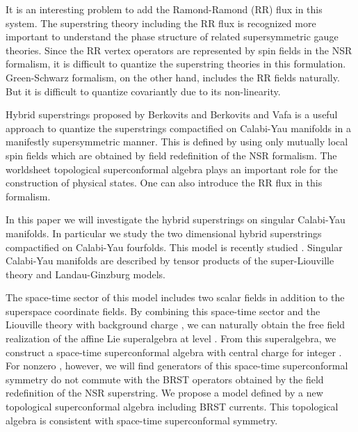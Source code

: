 \documentclass[a4paper,12pt]{article}
\begin{document}
It is an interesting problem to add the 
Ramond-Ramond (RR) flux in this system.
The superstring theory including the RR flux is recognized more
important to understand the phase structure of related supersymmetric
gauge theories\cite{Va}. 
Since the RR vertex operators are represented by spin fields in the 
NSR formalism, it is difficult  to quantize the superstring theories
in this formulation.
Green-Schwarz formalism, on the other hand, includes the RR fields
naturally. But it is difficult to quantize covariantly due to its 
non-linearity.

Hybrid superstrings proposed by Berkovits \cite{Be} and Berkovits and
Vafa \cite{BeVa}
is a useful approach to quantize the superstrings compactified on 
Calabi-Yau manifolds in a manifestly supersymmetric manner.
This is defined by using only mutually local spin fields which are 
obtained by field redefinition of the NSR formalism.
The worldsheet topological \coordHE{} superconformal algebra plays an
important role for the construction of physical states.
One can also introduce the RR flux in this formalism\cite{BeVaWi}.

In this paper we will investigate the hybrid superstrings on singular
Calabi-Yau
manifolds. In particular we study the two dimensional hybrid
superstrings
compactified on Calabi-Yau fourfolds. This model is recently studied
\cite{BeGuVa}.
Singular Calabi-Yau manifolds are described by tensor products of the
\coordHE{} 
super-Liouville theory and \coordHE{} Landau-Ginzburg models.

The space-time sector of this model includes two scalar fields
\coordHE{}
in addition to the superspace coordinate fields.  By combining this
space-time
sector and the \coordHE{} Liouville theory with background charge
\coordHE{},
we can naturally obtain the free field realization of the affine Lie
superalgebra
\coordHE{} at level \coordHE{}. From this superalgebra, we construct a
space-time
\coordHE{} superconformal algebra with central charge \coordHE{} for integer
\coordHE{}.
For nonzero \coordHE{}, however, we will find generators of this space-time
superconformal
symmetry do not commute with the BRST operators obtained by the field
redefinition of
the NSR superstring. We propose a model defined by a new topological
\coordHE{} superconformal
algebra including BRST currents. This topological algebra is consistent
with space-time
\coordHE{} superconformal symmetry.
\end{document}
